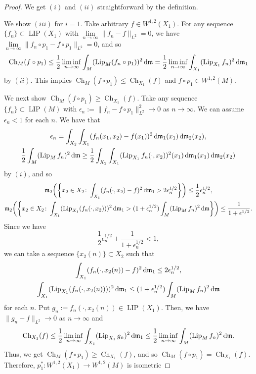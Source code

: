 \documentclass[pdftex]{sigma}
\numberwithin{equation}{section}
\theoremstyle{definition}
\newcommand{\LIP}{\operatorname{LIP}}
\newcommand{\Lip}{\operatorname{Lip}}
\newcommand{\Ch}{\operatorname{Ch}}
\newcommand{\mf}{\mathfrak{m}}
\begin{document}
\begin{proof}
We get $(i)$ and $(ii)$ straightforward by the definition.

We show $(iii)$ for $i=1$.
Take arbitrary $f\in W^{1,2}(X_1)$.
For any sequence $\{f_n\}\subset \LIP(X_1)$ with $\lim\limits_{n\to \infty}\|f_n-f\|_{L^2}=0$, we have
$\lim\limits_{n\to \infty}\|f_n\circ p_1-f\circ p_1\|_{L^2}=0$, and so
\[
\Ch_M(f\circ p_1)\leq\frac{1}{2} \liminf_{n\to \infty}\int_M (\Lip_M(f_n\circ p_1))^2\,{\rm d}\mf=\frac{1}{2}\liminf_{n\to \infty}\int_{X_1}(\Lip_{X_1} f_n)^2\,{\rm d}\mf_1
\]
by $(ii)$. This implies $\Ch_M(f\circ p_1)\leq \Ch_{X_1}(f)$ and $f\circ p_1\in W^{1,2}(M)$.

We next show $\Ch_M(f\circ p_1)\geq \Ch_{X_1}(f)$.
Take any sequence $\{f_n\}\subset\LIP(M)$ with $\epsilon_n:=\|f_n-f\circ p_1\|_{L^2}^2\to 0$ as $n\to\infty$.
We can assume $\epsilon_n<1$ for each $n$.
We have that
\begin{gather*}
\epsilon_n=\int_{X_2} \int_{X_1} (f_n(x_1,x_2)-f(x_1))^2\,{\rm d}\mf_1(x_1)\,{\rm d}\mf_2(x_2),
\\
\frac{1}{2} \int_M (\Lip_M f_n)^2\,{\rm d}\mf\geq \frac{1}{2}\int_{X_2} \int_{X_1} (\Lip_{X_1} f_n(\cdot,x_2))^2(x_1)\,{\rm d}\mf_1(x_1)\,{\rm d}\mf_2(x_2)
\end{gather*}
by $(i)$,
and so
\begin{gather*}
\mf_2\bigg(\bigg\{x_2\in X_2\colon \int_{X_1}(f_n(\cdot,x_2)-f)^2\,{\rm d}\mf_1> 2\epsilon_n^{1/2}\bigg\}\bigg)\leq \frac{1}{2}\epsilon_n^{1/2},
\\
\mf_2\bigg(\bigg\{x_2\in X_2\colon \int_{X_1}(\Lip_{X_1}(f_n(\cdot,x_2)))^2\,{\rm d}\mf_1> (1+\epsilon_n^{1/2})\int_M(\Lip_M f_n)^2\,{\rm d}\mf\bigg\}\bigg)\leq \frac{1}{1+\epsilon^{1/2}}.
\end{gather*}
Since we have
\[
\frac{1}{2}\epsilon_n^{1/2}+\frac{1}{1+\epsilon_n^{1/2}}<1,
\]
we can take a sequence $\{x_2(n)\}\subset X_2$ such that
\begin{gather*}
\int_{X_1}(f_n(\cdot,x_2(n))-f)^2\,{\rm d}\mf_1\leq 2\epsilon_n^{1/2},
\\
\int_{X_1}(\Lip_{X_1}(f_n(\cdot,x_2(n))))^2\,{\rm d}\mf_1
\leq  (1+\epsilon_n^{1/2})\int_M(\Lip_M f_n)^2\,{\rm d}\mf
\end{gather*}
for each $n$.
Put $g_n:=f_n(\cdot, x_2(n))\in\LIP(X_1)$.
Then, we have $\|g_n-f\|_{L^2}\to 0$ as $n\to\infty$ and
\[
\Ch_{X_1}(f)\leq \frac{1}{2}\liminf_{n\to \infty}\int_{X_1}(\Lip_{X_1}g_n)^2\,{\rm d}\mf_1\leq \frac{1}{2}\liminf_{n\to \infty}\int_M(\Lip_M f_n)^2\,{\rm d}\mf.
\]
Thus, we get $\Ch_M(f\circ p_1)\!\geq\! \Ch_{X_1}(f)$, and so $\Ch_M(f\circ p_1)\!=\! \Ch_{X_1}(f)$.
Therefore, $p_1^\ast\colon W^{1,2}(X_1)\!\to W^{1,2}(M)$ is isometric


\end{proof}
\end{document}
